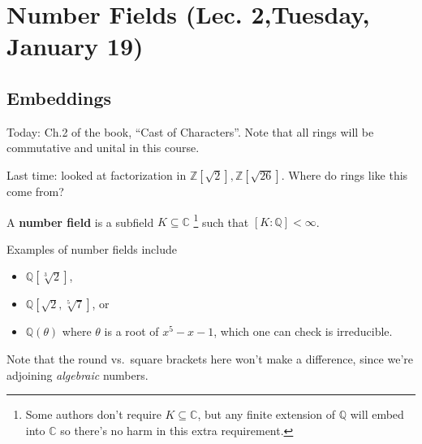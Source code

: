 \hypertarget{number-fields-lec.-2tuesday-january-19}{%
\section{Number Fields (Lec. 2,Tuesday, January
19)}\label{number-fields-lec.-2tuesday-january-19}}

\hypertarget{embeddings}{%
\subsection{Embeddings}\label{embeddings}}

\begin{remark}

Today: Ch.2 of the book, ``Cast of Characters''. Note that all rings
will be commutative and unital in this course.

Last time: looked at factorization in
\({\mathbb{Z}}[\sqrt 2], {\mathbb{Z}}[\sqrt{26}]\). Where do rings like
this come from?

\end{remark}

\begin{definition}

A \textbf{number field} is a subfield \(K \subseteq {\mathbb{C}}\)
\footnote{Some authors don't require \(K \subseteq {\mathbb{C}}\), but
  any finite extension of \({\mathbb{Q}}\) will embed into
  \({\mathbb{C}}\) so there's no harm in this extra requirement.} such
that \([K: {\mathbb{Q}}] < \infty\).

\end{definition}

\begin{example}

Examples of number fields include

\begin{itemize}
\tightlist
\item
  \({\mathbb{Q}}[\sqrt[3]{2}]\),
\item
  \({\mathbb{Q}}[\sqrt 2, \sqrt[5]{7}]\), or
\item
  \({\mathbb{Q}}(\theta)\) where \(\theta\) is a root of
  \(x^5 - x - 1\), which one can check is irreducible.
\end{itemize}

Note that the round vs.~square brackets here won't make a difference,
since we're adjoining \emph{algebraic} numbers.

\end{example}

